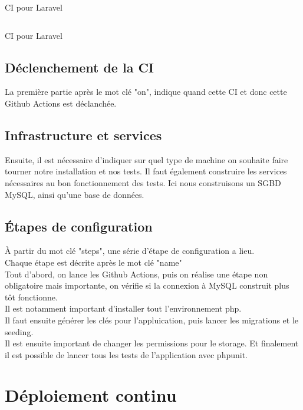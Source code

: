 \documentclass[
    iai, %
    il, %
]{heig-tb}
\begin{document}
\begin{listing}[h]
    \inputminted{yaml}{assets/code/ci-1.yml}
    \caption{CI pour Laravel \label{ci-1}}
\end{listing}

\begin{listing}[h]
    \inputminted{yaml}{assets/code/ci-2.yml}
    \caption{CI pour Laravel \label{ci-2}}
\end{listing}

\section{Déclenchement de la CI}
La première partie après le mot clé "on", indique quand cette CI et donc cette Github Actions est
déclanchée.\\

\section{Infrastructure et services}
Ensuite, il est nécessaire d'indiquer sur quel type de machine on souhaite faire tourner notre
installation et nos tests. Il faut également construire les services nécessaires au bon
fonctionnement des tests. Ici nous construisons un SGBD MySQL, ainsi qu'une base de données.\\

\section{Étapes de configuration}

À partir du mot clé "steps", une série d'étape de configuration a lieu.\\
Chaque étape est décrite après le mot clé "name"\\
Tout d'abord, on lance les Github Actions, puis on réalise une étape non obligatoire mais
importante, on vérifie si la connexion à MySQL construit plus tôt fonctionne.\\
Il est notamment important d'installer tout l'environnement php.\\
Il faut ensuite générer les clés pour l'appluication, puis lancer les migrations et le
seeding.\\
Il est ensuite important de changer les permissions pour le storage. Et finalement il est possible
de lancer tous les tests de l'application avec phpunit.

\chapter{Déploiement continu}
\end{document}

